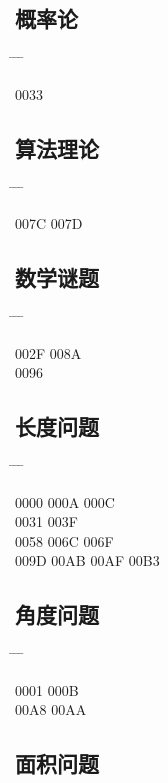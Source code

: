 \documentclass[twoside, twocolumn]{ctexart}
\newenvironment{problist}{
  \begin{center} \ttfamily \begin{tabbing}
      \hspace{50pt} \= \hspace{50pt} \= \hspace{50pt} \= \kill
  }{ \end{tabbing} \end{center} }
\begin{document}
  \subsection*{概率论}

  \begin{problist}
    0033   \\
  \end{problist}

  \subsection*{算法理论}

  \begin{problist}
    007C \> 007D \\
  \end{problist}

  \subsection*{数学谜题}

  \begin{problist}
    002F   \> 008A \\ 0096 \\
  \end{problist}

  \subsection*{长度问题}

  \begin{problist}
    0000 \> 000A \> 000C  \\ 0031 \> 003F   \\
    0058 \> 006C \> 006F  \\ 009D \> 00AB \> 00AF \> 00B3 \\
  \end{problist}

  \subsection*{角度问题}

  \begin{problist}
    0001  \> 000B  \\ 00A8 \> 00AA \\
  \end{problist}

  \subsection*{面积问题}
\end{document}
